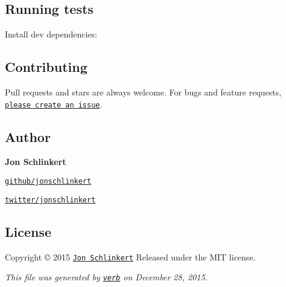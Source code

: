 \subsection*{Running tests}

Install dev dependencies\+:




\subsection*{Contributing}

Pull requests and stars are always welcome. For bugs and feature requests, \href{https://github.com/jonschlinkert/is-data-descriptor/issues/new}{\tt please create an issue}.

\subsection*{Author}

{\bfseries Jon Schlinkert}


\begin{DoxyItemize}
\item \href{https://github.com/jonschlinkert}{\tt github/jonschlinkert}
\item \href{http://twitter.com/jonschlinkert}{\tt twitter/jonschlinkert}
\end{DoxyItemize}

\subsection*{License}

Copyright © 2015 \href{https://github.com/jonschlinkert}{\tt Jon Schlinkert} Released under the M\+IT license.





{\itshape This file was generated by \href{https://github.com/verbose/verb}{\tt verb} on December 28, 2015.} 